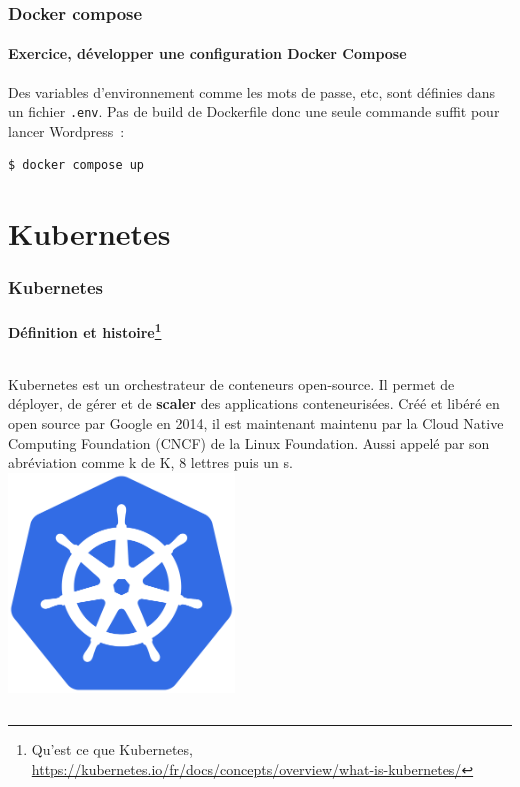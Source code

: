 \documentclass{beamer}
\begin{document}
    \begin{frame}[fragile]
        \transdissolve
        \frametitle{Docker compose}
        \framesubtitle{Exercice, développer une configuration Docker Compose}
        Des variables d'environnement comme les mots de passe, etc, sont définies dans un fichier \lstinline{.env}.
        \bigbreak
        Pas de build de Dockerfile donc une seule commande suffit pour lancer Wordpress~:
        \begin{lstlisting}[language=bash]
$ docker compose up
        \end{lstlisting}
    \end{frame}


    \section{Kubernetes}\label{sec:kubernetes}

    \begin{frame}
        \transdissolve
        \frametitle{Kubernetes}
        \framesubtitle{Définition et histoire\footnote{Qu'est ce que Kubernetes, \url{https://kubernetes.io/fr/docs/concepts/overview/what-is-kubernetes/}}}
        \begin{columns}
            Kubernetes est un orchestrateur de conteneurs open-source.
            Il permet de déployer, de gérer et de \textbf{scaler} des applications conteneurisées.
            \bigbreak
            Créé et libéré en open source par Google en 2014, il est maintenant maintenu par la Cloud Native Computing Foundation (CNCF) de la Linux Foundation.
            \bigbreak
            Aussi appelé par son abréviation  comme k de K, 8 lettres puis un s.
            \centering
            \includegraphics[width=6cm]{image/kubernetes-logo}
        \end{columns}
    \end{frame}
\end{document}
